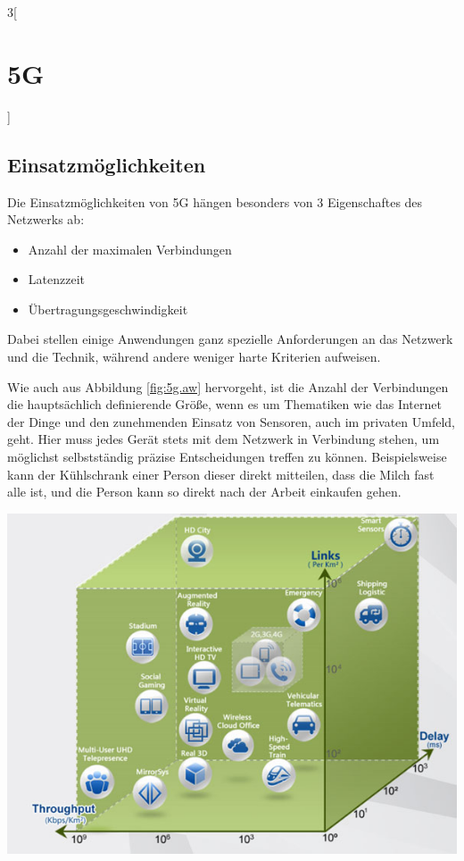 \begin{multicols}{3}[\section{5G}]
\subsection*{Einsatzmöglichkeiten}
Die Einsatzmöglichkeiten von 5G hängen besonders von 3 Eigenschaftes des Netzwerks ab:
\begin{itemize}
\item Anzahl der maximalen Verbindungen
\item Latenzzeit
\item Übertragungsgeschwindigkeit
\end{itemize}

Dabei stellen einige Anwendungen ganz spezielle Anforderungen an das Netzwerk und die Technik, während andere weniger harte Kriterien aufweisen.

Wie auch aus Abbildung \ref{fig:5g.aw} hervorgeht, ist die Anzahl der Verbindungen die hauptsächlich definierende Größe, wenn es um Thematiken wie das Internet der Dinge und den zunehmenden Einsatz von Sensoren, auch im privaten Umfeld, geht.
Hier muss jedes Gerät stets mit dem Netzwerk in Verbindung stehen, um möglichst selbstständig präzise Entscheidungen treffen zu können. Beispielsweise kann der Kühlschrank einer Person dieser direkt mitteilen, dass die Milch fast alle ist, und die Person kann so direkt nach der Arbeit einkaufen gehen.

\begin{Figure}
\includegraphics[width=\linewidth]{Kapitel/5G/Grafiken/5g-anwendung}
\label{fig:5g.aw}
\end{Figure}


\end{multicols}
